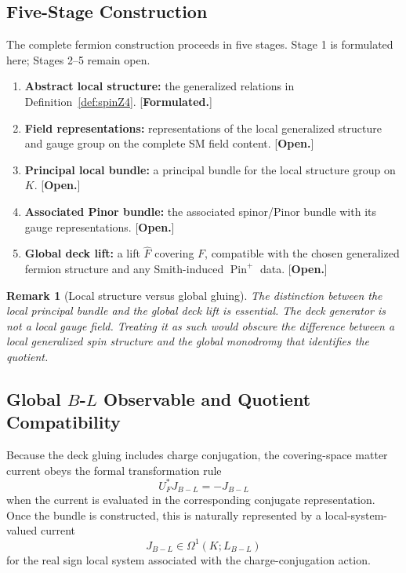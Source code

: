 \documentclass[11pt]{article}
\theoremstyle{canonmath}
\newtheorem{remark}[theorem]{Remark}
\theoremstyle{canonpostulate}
\theoremstyle{canonclaim}
\providecommand{\Klein}{\mathcal{K}}
\providecommand{\Pin}{\operatorname{Pin}}
\def\mathcal#1{#1}%
\begin{document}
\subsection{Five-Stage Construction}

The complete fermion construction proceeds in five stages. Stage 1 is formulated here; Stages 2--5 remain open.

\begin{enumerate}
\item \textbf{Abstract local structure:} the generalized relations in Definition~\ref{def:spinZ4}. [\textbf{Formulated.}]
\item \textbf{Field representations:} representations of the local generalized structure and gauge group on the complete SM field content. [\textbf{Open.}]
\item \textbf{Principal local bundle:} a principal bundle for the local structure group on $\Klein$. [\textbf{Open.}]
\item \textbf{Associated Pinor bundle:} the associated spinor/Pinor bundle with its gauge representations. [\textbf{Open.}]
\item \textbf{Global deck lift:} a lift $\widehat F$ covering $F$, compatible with the chosen generalized fermion structure and any Smith-induced $\Pin^+$ data. [\textbf{Open.}]
\end{enumerate}

\begin{remark}[Local structure versus global gluing]
The distinction between the local principal bundle and the global deck lift is essential. The deck generator is not a local gauge field. Treating it as such would obscure the difference between a local generalized spin structure and the global monodromy that identifies the quotient.
\end{remark}

\subsection{Global \texorpdfstring{$B$-$L$}{B-L} Observable and Quotient Compatibility}

Because the deck gluing includes charge conjugation, the covering-space matter current obeys the formal transformation rule
\begin{equation}
U_F^*J_{B-L}=-J_{B-L}
\end{equation}
when the current is evaluated in the corresponding conjugate representation. Once the bundle is constructed, this is naturally represented by a local-system-valued current
\begin{equation}
J_{B-L}\in\Omega^1(\Klein;\mathcal L_{B-L})
\end{equation}
for the real sign local system associated with the charge-conjugation action.
\end{document}
